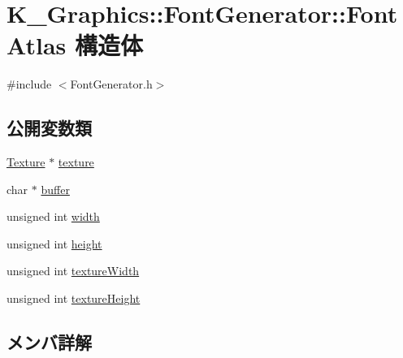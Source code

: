 \hypertarget{struct_k___graphics_1_1_font_generator_1_1_font_atlas}{}\section{K\+\_\+\+Graphics\+:\+:Font\+Generator\+:\+:Font\+Atlas 構造体}
\label{struct_k___graphics_1_1_font_generator_1_1_font_atlas}


{\ttfamily \#include $<$Font\+Generator.\+h$>$}

\subsection*{公開変数類}
\begin{DoxyCompactItemize}
\item 
\mbox{\hyperlink{class_k___graphics_1_1_texture}{Texture}} $\ast$ \mbox{\hyperlink{struct_k___graphics_1_1_font_generator_1_1_font_atlas_a8baa5f2223d8b7d2c941f8b25dbe8bbb}{texture}}
\item 
char $\ast$ \mbox{\hyperlink{struct_k___graphics_1_1_font_generator_1_1_font_atlas_af111ad1cbd008ffda2493d2dbbf19313}{buffer}}
\item 
unsigned int \mbox{\hyperlink{struct_k___graphics_1_1_font_generator_1_1_font_atlas_aec8f2bf718152b3d8cb804a6da87b76b}{width}}
\item 
unsigned int \mbox{\hyperlink{struct_k___graphics_1_1_font_generator_1_1_font_atlas_a1bca66a68215e07df7ddb1e3de90fff7}{height}}
\item 
unsigned int \mbox{\hyperlink{struct_k___graphics_1_1_font_generator_1_1_font_atlas_a1e7f96ad116e52c8f1f00c3df998931c}{texture\+Width}}
\item 
unsigned int \mbox{\hyperlink{struct_k___graphics_1_1_font_generator_1_1_font_atlas_a69fa52d8f8237fdd3fbe2e272bd7b832}{texture\+Height}}
\end{DoxyCompactItemize}


\subsection{メンバ詳解}
\mbox{\label{struct_k___graphics_1_1_font_generator_1_1_font_atlas_af111ad1cbd008ffda2493d2dbbf19313}} 
